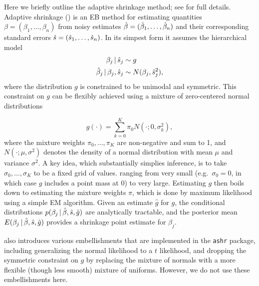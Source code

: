 \documentclass[12pt]{article}
\begin{document}
Here we briefly outline the adaptive shrinkage method; see \cite{stephens:2015} for full details.
Adaptive shrinkage (\ash) is an EB method
for estimating quantities $\beta=(\beta_1,\dots,\beta_n)$ from noisy estimates 
$\hat{\beta}=(\hat{\beta}_1,\dots,\hat{\beta}_n)$ and their corresponding standard errors $\hat{s} = (\hat{s}_1,\dots,\hat{s}_n)$. 
In its simpest form it assumes the hierarchical model
\begin{align}
\label{eq:ash_model_1}\beta_j \,|\, \hat{s}_j & \sim g \\
\hat{\beta}_j \,|\, \beta_j, \hat{s}_j & \sim N(\beta_j, \hat{s}_j^2),
\end{align}
where the distribution $g$ is constrained to be unimodal and symmetric. This constraint on $g$ can
be flexibly achieved using 
a mixture of zero-centered normal distributions

\begin{equation}
g(\cdot)=\sum_{k=0}^K \pi_0 N(\cdot;0,\sigma_k^2),
\end{equation}
where the mixture weights $\pi_0,\dots,\pi_K$ are non-negative and sum to 1, and $N(\cdot; \mu,\sigma^2)$ denotes
the density of a normal distribution with mean $\mu$ and variance $\sigma^2$.
A key idea, which substantially simplies inference, is to take
$\sigma_0,\dots,\sigma_K$ to be a fixed grid of values. ranging from very small (e.g.~$\sigma_0=0$,
in which case $g$ includes a point mass at 0) to very large. Estimating $g$ then boils down to estimating
the mixture weights $\pi$, which is done by maximum likelihood using a simple EM algorithm.
Given an estimate $\hat{g}$ for $g$, the conditional distributions $p(\beta_j \,|\, \hat{\beta}, \hat{s}, \hat{g})$ are analytically
tractable, and the posterior mean $E(\beta_j \,|\, \hat{\beta}, \hat{s}, \hat{g})$ provides a shrinkage point estimate for $\beta_j$.

\cite{stephens:2015} also introduces various embellishments that are implemented in the {\tt ashr}
package, including generalizing the normal likelihood to a $t$ likelihood, and dropping the symmetric
constraint on $g$ by replacing the mixture
of normals with a more flexible (though less smooth) mixture of uniforms. However, we do not use these embellishments here. 

\end{document}
